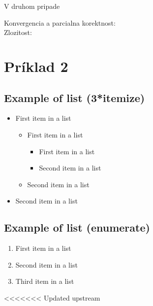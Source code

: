 \documentclass[paper=a4, fontsize=11pt]{scrartcl} %
\numberwithin{equation}{section} %
\numberwithin{figure}{section} %
\numberwithin{table}{section} %
\begin{document}
V druhom pripade

Konvergencia a parcialna korektnost:\\
Zlozitost: \\

\pagebreak

\section*{Príklad 2}

\subsection{Example of list (3*itemize)}
\begin{itemize}
	\item First item in a list 
		\begin{itemize}
		\item First item in a list 
			\begin{itemize}
			\item First item in a list 
			\item Second item in a list 
			\end{itemize}
		\item Second item in a list 
		\end{itemize}
	\item Second item in a list 
\end{itemize}


\subsection{Example of list (enumerate)}
\begin{enumerate}
\item First item in a list 
\item Second item in a list 
\item Third item in a list
\end{enumerate}


<<<<<<< Updated upstream
\pagebreak
\end{document}
